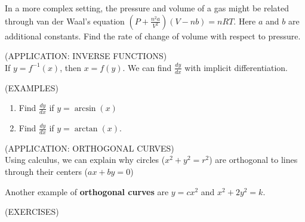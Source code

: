 \documentclass[11pt]{article}
\begin{document}
\vspace{1in}

In a more complex setting, the pressure and volume of a gas might be related through van der Waal's equation  $(P+\frac{n^2a}{V^2})(V-nb)=nRT$.
Here $a$ and $b$ are additional constants.  Find the rate of change of volume with respect to pressure.


\vspace{2.5in}

\pagebreak

(APPLICATION:  INVERSE FUNCTIONS) \\
If $y = f^{-1}(x)$, then $x = f(y)$.  We can find $\frac{dy}{dx}$ with implicit differentiation.

  \vspace{1.2in}
  
(EXAMPLES)
\begin{enumerate}
\item{Find $\frac{dy}{dx}$ if $y = \arcsin(x)$}

  \vspace{3.5in}

\item{Find $\frac{dy}{dx}$ if $y = \arctan(x)$.}


    \vspace{2.5in}

  
\end{enumerate}

\pagebreak

(APPLICATION:  ORTHOGONAL CURVES) \\

Using calculus, we can explain why circles ($x^2+y^2 = r^2$) are orthogonal to lines through their centers ($ax + by = 0$)


\vspace{3in}

Another example of {\bf orthogonal curves} are $y=cx^2$ and $x^2+2y^2 = k$.


\vspace{3in}

\pagebreak

(EXERCISES)
\end{document}
